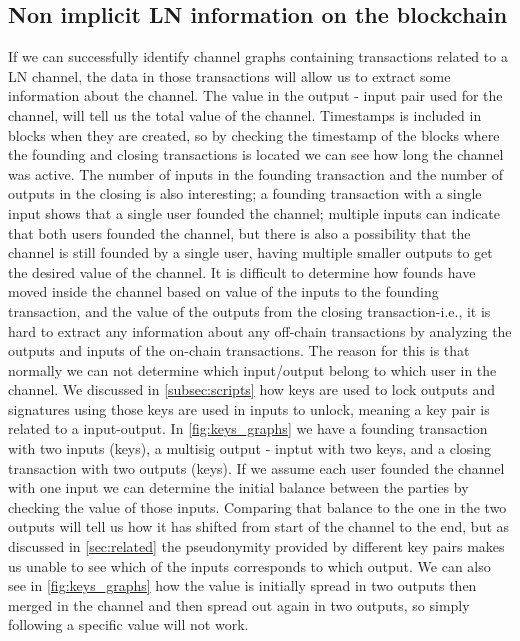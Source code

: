 
\subsection{Non implicit LN information on the blockchain}
\label{subsec:information_ln}

If we can successfully identify channel graphs containing transactions related to a LN channel, the data in those transactions will allow us to extract some information about the channel.
The value in the output - input pair used for the channel, will tell us the total value of the channel.
Timestamps is included in blocks when they are created, so by checking the timestamp of the blocks where the founding and closing transactions is located we can see how long the channel was active.
The number of inputs in the founding transaction and the number of outputs in the closing is also interesting; a founding transaction with a single input shows that a single user founded the channel; multiple inputs can indicate that both users founded the channel, but there is also a possibility that the channel is still founded by a single user, having multiple smaller outputs to get the desired value of the channel.
It is difficult to determine how founds have moved inside the channel based on value of the inputs to the founding transaction, and the value of the outputs from the closing transaction-i.e., it is hard to extract any information about any off-chain transactions by analyzing the outputs and inputs of the on-chain transactions.
The reason for this is that normally we can not determine which input/output belong to which user in the channel.
We discussed in \cref{subsec:scripts} how keys are used to lock outputs and signatures using those keys are used in inputs to unlock, meaning a key pair is related to a input-output.
In \cref{fig:keys_graphs} we have a founding transaction with two inputs (keys), a multisig output - inptut with two keys, and a closing transaction with two outputs (keys).
If we assume each user founded the channel with one input we can determine the initial balance between the parties by checking the value of those inputs.
Comparing that balance to the one in the two outputs will tell us how it has shifted from start of the channel to the end, but as discussed in \cref{sec:related} the pseudonymity provided by different key pairs makes us unable to see which of the inputs corresponds to which output.
We can also see in \cref{fig:keys_graphs} how the value is initially spread in two outputs then merged in the channel and then spread out again in two outputs, so simply following a specific value will not work.
